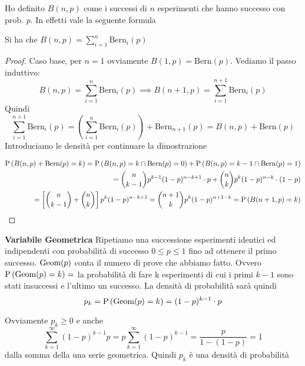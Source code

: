 Ho definito $ B(n,p)$ come i successi di $ n $ esperimenti che hanno successo con prob. $ p $.
In effetti vale la seguente formula
\begin{prop}
	Si ha che
	$B(n,p)= \sum_{i=1}^{n} \text{Bern}_i(p) $
\end{prop}
    \begin{proof}
        Caso base, per $ n = 1$ ovviamente $B(1,p) = \text{Bern}(p)$. Vediamo il passo induttivo:
        \begin{equation*}
        B(n,p) = \sum_{i=1}^{n} \text{Bern}_i(p) \implies B(n+1,p) = \sum_{i=1}^{n+1} \text{Bern}_i(p)
        \end{equation*}
        Quindi
        $$\sum_{i=1}^{n+1} \text{Bern}_i(p) = \left( \sum_{i=1}^{n} \text{Bern}_i(p) \right) + \text{Bern}_{n+1}(p) =
        B(n,p) + \text{Bern}(p)$$
        Introduciamo le densit\`a  per continuare la dimostrazione
        
        \begin{equation*}
        \begin{aligned}
        \text{P}\left(B(n,p) + \text{Bern}(p) = k\right) = \text{P}\left(B(n,p) = k \cap \text{Bern}(p) = 0\right) + \text{P}\left(B(n,p) = k-1 \cap \text{Bern}(p) = 1\right) \\
        = \binom{n}{k-1}p^{k-1}(1-p)^{n-k+1} \cdot p + \binom{n}{k}p^k(1-p)^{n-k} \cdot  (1-p) \\
		= \left[\binom{n}{k-1}+\binom{n}{k}\right] p^k (1-p)^{n-k+1} = \binom{n+1}{k} p^k (1-p)^{n+1-k} = \text{P}\left(B(n+1,p) = k\right)
        \end{aligned}
        \end{equation*}
    \end{proof}
    


\begin{defn}
    \textbf{Variabile Geometrica}
	Ripetiamo una successione esperimenti identici ed indipendenti con probabilit\`a  di successo $ 0 \leq p \leq 1 $  fino ad ottenere il primo successo. $ \text{Geom}(p) $ conta il numero di prove che abbiamo fatto. Ovvero $ \text{P}\left(\text{Geom}(p) = k\right) = $ la probabilit\`a  di fare k esperimenti di cui i primi $k-1$ sono stati insuccessi e l'ultimo un successo. La densit\`a  di probabilit\`a  sar\`a quindi
	$$ p_k = \text{P}\left(\text{Geom}(p) = k\right) = (1-p)^{k-1} \cdot p $$
\end{defn}
Ovviamente $ p_k \geq 0 $ e anche
$$ \sum_{k=1}^{\infty} (1-p)^{k-1} p = p \sum_{k=1}^{\infty}(1-p)^{k-1}= \dfrac{p}{1-(1-p)} = 1 $$ dalla somma della una serie geometrica. Quindi $p_k$ \`e una  densit\`a  di probabilit\`a

